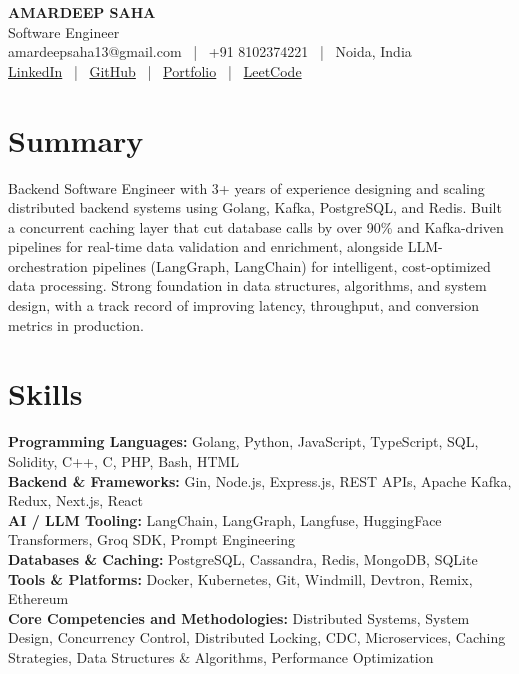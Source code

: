 \documentclass[8pt,a4paper]{extarticle}
\begin{document}
\begin{center}
  {\LARGE \textbf{AMARDEEP SAHA}}\\[2pt]
  Software Engineer\\[2pt]
  amardeepsaha13@gmail.com \ | \ +91 8102374221 \ | \ Noida, India\\[2pt]
  \href{https://www.linkedin.com/in/alpha-coder13/}{LinkedIn} \ | \
  \href{https://github.com/alpha-coder13/}{GitHub} \ | \
  \href{https://alpha-coder13.github.io/MyPortfolio/}{Portfolio} \ | \
  \href{https://leetcode.com/u/amardeepsaha13/}{LeetCode}
\end{center}

\section*{Summary}
Backend Software Engineer with 3+ years of experience designing and scaling distributed backend systems using Golang, Kafka, PostgreSQL, and Redis. Built a concurrent caching layer that cut database calls by over 90\% and Kafka-driven pipelines for real-time data validation and enrichment, alongside LLM-orchestration pipelines (LangGraph, LangChain) for intelligent, cost-optimized data processing. Strong foundation in data structures, algorithms, and system design, with a track record of improving latency, throughput, and conversion metrics in production.

\section*{Skills}
\textbf{Programming Languages:} Golang, Python, JavaScript, TypeScript, SQL, Solidity, C++, C, PHP, Bash, HTML\\
\textbf{Backend \& Frameworks:} Gin, Node.js, Express.js, REST APIs, Apache Kafka, Redux, Next.js, React\\
\textbf{AI / LLM Tooling:} LangChain, LangGraph, Langfuse, HuggingFace Transformers, Groq SDK, Prompt Engineering\\
\textbf{Databases \& Caching:} PostgreSQL, Cassandra, Redis, MongoDB, SQLite\\
\textbf{Tools \& Platforms:} Docker, Kubernetes, Git, Windmill, Devtron, Remix, Ethereum\\
\textbf{Core Competencies and Methodologies:} Distributed Systems, System Design, Concurrency Control, Distributed Locking, CDC, Microservices, Caching Strategies, Data Structures \& Algorithms, Performance Optimization
\end{document}
